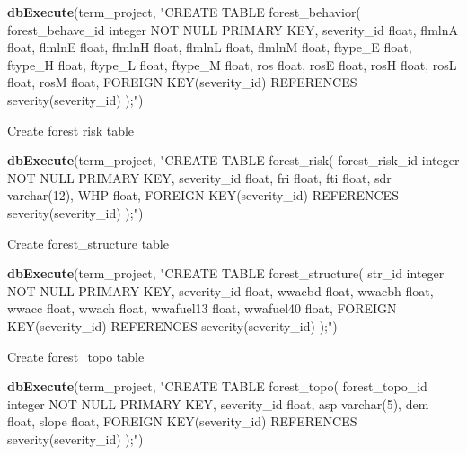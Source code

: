 \documentclass[]{book}
\newenvironment{Shaded}{\begin{snugshade}}{\end{snugshade}}
\newcommand{\KeywordTok}[1]{\textcolor[rgb]{0.13,0.29,0.53}{\textbf{#1}}}
\newcommand{\NormalTok}[1]{#1}
\newcommand{\StringTok}[1]{\textcolor[rgb]{0.31,0.60,0.02}{#1}}
\begin{document}
\begin{Shaded}
\begin{Highlighting}[]
\KeywordTok{dbExecute}\NormalTok{(term_project, }\StringTok{"CREATE TABLE forest_behavior(}
\StringTok{forest_behave_id integer NOT NULL PRIMARY KEY,}
\StringTok{severity_id float,}
\StringTok{flmlnA float,}
\StringTok{flmlnE float,}
\StringTok{flmlnH float,}
\StringTok{flmlnL float,}
\StringTok{flmlnM float,}
\StringTok{ftype_E float,}
\StringTok{ftype_H float,}
\StringTok{ftype_L float,}
\StringTok{ftype_M float,}
\StringTok{ros float,}
\StringTok{rosE float,}
\StringTok{rosH float,}
\StringTok{rosL float,}
\StringTok{rosM float,}
\StringTok{FOREIGN KEY(severity_id) REFERENCES severity(severity_id)}
\StringTok{);"}\NormalTok{)}
\end{Highlighting}
\end{Shaded}

Create forest risk table

\begin{Shaded}
\begin{Highlighting}[]
\KeywordTok{dbExecute}\NormalTok{(term_project, }\StringTok{"CREATE TABLE forest_risk(}
\StringTok{forest_risk_id integer NOT NULL PRIMARY KEY,}
\StringTok{severity_id float,}
\StringTok{fri float,}
\StringTok{fti float,}
\StringTok{sdr varchar(12),}
\StringTok{WHP float,}
\StringTok{FOREIGN KEY(severity_id) REFERENCES severity(severity_id)}
\StringTok{);"}\NormalTok{)}
\end{Highlighting}
\end{Shaded}

Create forest\_structure table

\begin{Shaded}
\begin{Highlighting}[]
\KeywordTok{dbExecute}\NormalTok{(term_project, }\StringTok{"CREATE TABLE forest_structure(}
\StringTok{str_id integer NOT NULL PRIMARY KEY,}
\StringTok{severity_id float,}
\StringTok{wwacbd float,}
\StringTok{wwacbh float,}
\StringTok{wwacc float,}
\StringTok{wwach float,}
\StringTok{wwafuel13 float,}
\StringTok{wwafuel40 float,}
\StringTok{FOREIGN KEY(severity_id) REFERENCES severity(severity_id)}
\StringTok{);"}\NormalTok{)}
\end{Highlighting}
\end{Shaded}

Create forest\_topo table

\begin{Shaded}
\begin{Highlighting}[]
\KeywordTok{dbExecute}\NormalTok{(term_project, }\StringTok{"CREATE TABLE forest_topo(}
\StringTok{forest_topo_id integer NOT NULL PRIMARY KEY,}
\StringTok{severity_id float,}
\StringTok{asp varchar(5),}
\StringTok{dem float,}
\StringTok{slope float,}
\StringTok{FOREIGN KEY(severity_id) REFERENCES severity(severity_id)}
\StringTok{);"}\NormalTok{)}
\end{Highlighting}
\end{Shaded}
\end{document}
